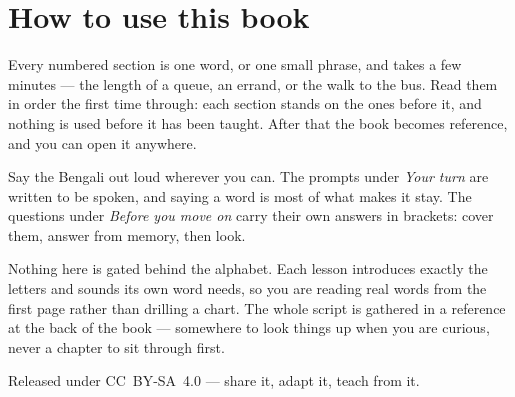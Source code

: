 \documentclass[11pt,twoside]{book}
\begin{document}
\section*{How to use this book}

Every numbered section is one word, or one small phrase, and takes a few
minutes --- the length of a queue, an errand, or the walk to the bus. Read them
in order the first time through: each section stands on the ones before it, and
nothing is used before it has been taught. After that the book becomes
reference, and you can open it anywhere.

Say the Bengali out loud wherever you can. The prompts under \emph{Your turn}
are written to be spoken, and saying a word is most of what makes it stay. The
questions under \emph{Before you move on} carry their own answers in brackets:
cover them, answer from memory, then look.

Nothing here is gated behind the alphabet. Each lesson introduces exactly the
letters and sounds its own word needs, so you are reading real words from the
first page rather than drilling a chart. The whole script is gathered in a
reference at the back of the book --- somewhere to look things up when you are
curious, never a chapter to sit through first.

Released under CC~BY-SA~4.0 --- share it, adapt it, teach from it.

\tableofcontents

\mainmatter


\end{document}
